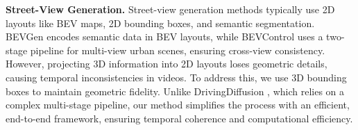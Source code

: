 \documentclass{article} %
\begin{document}

\noindent \textbf{Street-View Generation.}  
Street-view generation methods typically use 2D layouts like BEV maps, 2D bounding boxes, and semantic segmentation. BEVGen \cite{swerdlow2023street} encodes semantic data in BEV layouts, while BEVControl \cite{bevcontrol} uses a two-stage pipeline for multi-view urban scenes, ensuring cross-view consistency. However, projecting 3D information into 2D layouts loses geometric details, causing temporal inconsistencies in videos. To address this, we use 3D bounding boxes to maintain geometric fidelity. Unlike DrivingDiffusion \cite{li2023drivingdiffusionlayoutguidedmultiviewdriving}, which relies on a complex multi-stage pipeline, our method simplifies the process with an efficient, end-to-end framework, ensuring temporal coherence and computational efficiency.

\end{document}

